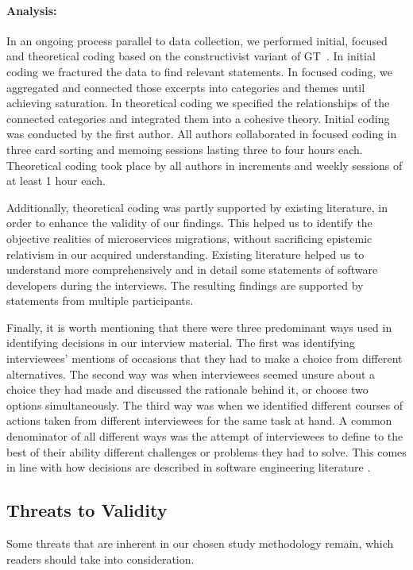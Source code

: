 \documentclass[sigconf,dvipsnames]{acmart}
\begin{document}
\paragraph*{Analysis:}
In an ongoing process parallel to data collection, we performed initial, focused and theoretical coding based on the constructivist variant of GT~\cite{charmaz2014constructing, Stol2016}. In initial coding we fractured the data to find relevant statements. In focused coding, we aggregated and connected those excerpts into categories and themes until achieving saturation. In theoretical coding we specified the relationships of the connected categories and integrated them into a cohesive theory. Initial coding was conducted by the first author. All authors collaborated in focused coding in three card sorting and memoing sessions lasting three to four hours each. Theoretical coding took place by all authors in increments and weekly sessions of at least 1 hour each. 

Additionally, theoretical coding was partly supported by existing literature, in order to enhance the validity of our findings. This helped us to identify the objective realities of microservices migrations, without sacrificing epistemic relativism in our acquired understanding. Existing literature helped us to understand more comprehensively and in detail some statements of software developers during the interviews. The resulting findings are supported by statements from multiple participants. 

Finally, it is worth mentioning that there were three predominant ways used in identifying decisions in our interview material. The first was identifying interviewees' mentions of occasions that they had to make a choice from different alternatives. The second way was when interviewees seemed unsure about a choice they had made and discussed the rationale behind it, or choose two options simultaneously. The third way was when we identified different courses of actions taken from different interviewees for the same task at hand. A common denominator of all different ways was the attempt of interviewees to define to the best of their ability different challenges or problems they had to solve. This comes in line with how decisions are described in software engineering literature \cite{zannier2007model}.


\subsection{Threats to Validity}
Some threats that are inherent in our chosen study methodology remain, which readers should take into consideration.
\end{document}
